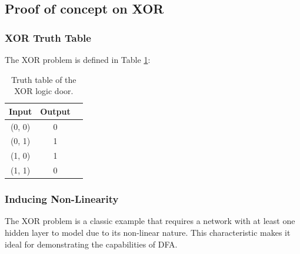 \documentclass[english]{article}
\begin{document}
\subsection{Proof of concept on XOR}




\subsubsection*{XOR Truth Table}
The XOR problem is defined in Table \ref{tab:TT_XOR}:
\begin{table}[h]
    \centering
    \begin{tabular}{|c|c|c|}
        \hline
        Input & Output \\
        \hline
        (0, 0) & 0 \\
        (0, 1) & 1 \\
        (1, 0) & 1 \\
        (1, 1) & 0 \\
        \hline
    \end{tabular}
    \caption{Truth table of the XOR logic door.}\label{tab:TT_XOR}
\end{table}

\subsubsection*{Inducing Non-Linearity}
The XOR problem is a classic example that requires a network with at least one hidden layer to model due to its non-linear nature. This characteristic makes it ideal for demonstrating the capabilities of DFA.
\end{document}
